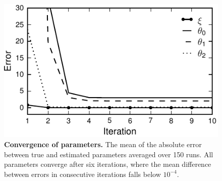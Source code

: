 \documentclass[12pt]{iopart}
\begin{document}
\begin{figure}[!ht]
\begin{center}
\includegraphics{./Graph/pdf/Figure6.pdf}
\end{center}
\caption{{\bf Convergence of parameters.} The mean of the absolute error between true and estimated parameters averaged over 150 runs. All parameters converge after six iterations, where the mean difference between errors in consecutive iterations falls below $10^{-4}$.}
\label{fig:Figure6}
\end{figure}
\end{document}
